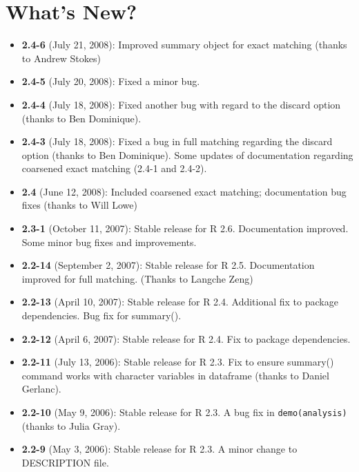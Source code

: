\documentclass[oneside,letterpaper,12pt]{book}
\begin{document}









\chapter{What's New?}

\begin{itemize}
\item \textbf{2.4-6} (July 21, 2008): Improved summary object for
  exact matching (thanks to Andrew Stokes)
\item \textbf{2.4-5} (July 20, 2008): Fixed a minor bug.
\item \textbf{2.4-4} (July 18, 2008): Fixed another bug with regard to the discard option (thanks to Ben Dominique).
\item \textbf{2.4-3} (July 18, 2008): Fixed a bug in full matching
  regarding the discard option (thanks to Ben Dominique). Some updates
  of documentation regarding coarsened exact matching (2.4-1 and
  2.4-2).
\item \textbf{2.4} (June 12, 2008): Included coarsened exact matching;
  documentation bug fixes (thanks to Will Lowe)
\item \textbf{2.3-1} (October 11, 2007): Stable release for R
  2.6. Documentation improved. Some minor bug fixes and improvements.
\item \textbf{2.2-14} (September 2, 2007): Stable release for R 2.5.
  Documentation improved for full matching. (Thanks to Langche Zeng)
\item \textbf{2.2-13} (April 10, 2007): Stable release for R
  2.4. Additional fix to package dependencies. Bug fix for summary().
\item \textbf{2.2-12} (April 6, 2007): Stable release for R 2.4. Fix
  to package dependencies.
\item \textbf{2.2-11} (July 13, 2006): Stable release for R 2.3.
  Fix to ensure summary() command works with character variables in dataframe (thanks to Daniel Gerlanc).
\item \textbf{2.2-10} (May 9, 2006): Stable release for R 2.3.
  A bug fix in {\tt demo(analysis)} (thanks to Julia Gray).
\item \textbf{2.2-9} (May 3, 2006): Stable release for R 2.3.
  A minor change to DESCRIPTION file.

\end{itemize}
\end{document}
